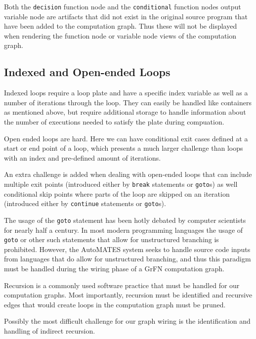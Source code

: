 Both the \texttt{decision} function node and the \texttt{conditional} function nodes output variable node are artifacts that did not exist in the original source program that have been added to the computation graph. Thus these will not be displayed when rendering the function node or variable node views of the computation graph.

\subsection{Indexed and Open-ended Loops\label{sec:loops}}
Indexed loops require a loop plate and have a specific index variable as well as a number of iterations through the loop. They can easily be handled like containers as mentioned above, but require additional storage to handle information about the number of executions needed to satisfy the plate during compuation.

Open ended loops are hard. Here we can have conditional exit cases defined at a start or end point of a loop, which presents a much larger challenge than loops with an index and pre-defined amount of iterations.

An extra challenge is added when dealing with open-ended loops that can include multiple exit points (introduced either by \texttt{break} statements or \texttt{goto}s) as well conditional skip points where parts of the loop are skipped on an iteration (introduced either by \texttt{continue} statements or \texttt{goto}s).

The usage of the \texttt{goto} statement has been hotly debated by computer scientists for nearly half a century. In most modern programming languages the usage of  \texttt{goto} or other such statements that allow for unstructured branching is prohibited. However, the AutoMATES system seeks to handle source code inputs from languages that do allow for unstructured branching, and thus this paradigm must be handled during the wiring phase of a GrFN computation graph.

Recursion is a commonly used software practice that must be handled for our computation graphs. Most importantly, recursion must be identified and recursive edges that would create loops in the computation graph must be pruned.

Possibly the most difficult challenge for our graph wiring is the identification and handling of indirect recursion.


